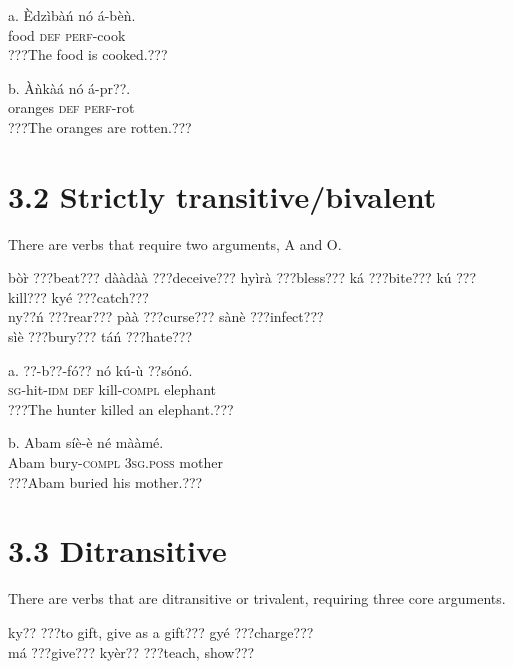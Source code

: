 \documentclass[output=paper]{langsci/langscibook}
\begin{document}
\ea
\gll a.  \`{E}dzìbàń  nó  á-bèǹ.\\
       food    \textsc{def}  \textsc{perf}{}-cook\\
\glt   ???The food is cooked.???
\z

\ea
\gll  b.  \`{A}ǹkàá    nó  á-pr??.\\
       oranges  \textsc{def}  \textsc{perf}{}-rot\\
\glt   ???The oranges are rotten.???
\z

\section{3.2  Strictly transitive/bivalent}

There are verbs that require two arguments, A and O.

\ea
 bò\`{r}   \textup{???beat???}    dààdàà   \textup{???deceive???}  hyìrà   \textup{???bless???}  
 ká     \textup{???bite???}    kú     \textup{???kill???}    kyé   \textup{???catch???}\\

 ny??ń   \textup{???rear???}    pàà     \textup{???curse???}    sànè   \textup{???infect???}    \\

 sìè     \textup{???bury???}    táń     \textup{???hate???}\\
 
 \z
 
 \ea
\gll a.  ??{}-b??-fó??  nó  kú-\`{u}     ??sónó.\\
       \textsc{sg}{}-hit-\textsc{idm}  \textsc{def}  kill-\textsc{compl}  elephant\\
\glt   ???The hunter killed an elephant.???  
\z

\ea
\gll  b.  Abam  síè-è     né    mààmé.\\
       Abam  bury-\textsc{compl}  \textsc{3sg.poss}  mother\\
\glt   ???Abam buried his mother.???
\z

\section{3.3  Ditransitive}

There are verbs that are ditransitive or trivalent, requiring three core arguments.

\ea
ky??   \textup{???to gift, give as a gift???  }  gyé   \textup{???charge???}\\
má     \textup{???give???}        kyèr??   \textup{???teach, show???}\\
\z
\end{document}
